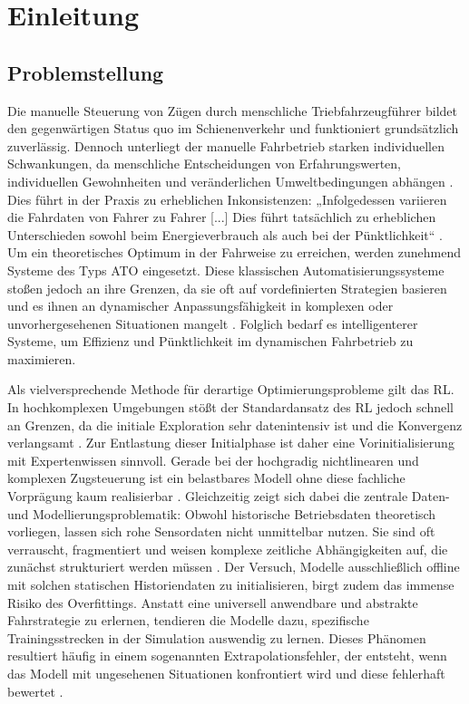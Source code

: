 \section{Einleitung}

\subsection{Problemstellung}
\label{sec:problemstellung}

Die manuelle Steuerung von Zügen durch menschliche Triebfahrzeugführer bildet den gegenwärtigen Status quo im Schienenverkehr und funktioniert grundsätzlich zuverlässig. 
Dennoch unterliegt der manuelle Fahrbetrieb starken individuellen Schwankungen, da menschliche Entscheidungen von Erfahrungswerten, individuellen Gewohnheiten und veränderlichen Umweltbedingungen abhängen \cite[vgl.~S.~2266]{chap1_Huang18}. 
Dies führt in der Praxis zu erheblichen Inkonsistenzen: „Infolgedessen variieren die Fahrdaten von Fahrer zu Fahrer [...] Dies führt tatsächlich zu erheblichen Unterschieden sowohl beim Energieverbrauch als auch bei der Pünktlichkeit“ \cite[S.~2267]{chap1_Huang18}. 
Um ein theoretisches Optimum in der Fahrweise zu erreichen, werden zunehmend Systeme des Typs \gls{ATO} eingesetzt.
Diese klassischen Automatisierungssysteme stoßen jedoch an ihre Grenzen, da sie oft auf vordefinierten Strategien basieren und es ihnen an dynamischer Anpassungsfähigkeit in komplexen oder unvorhergesehenen Situationen mangelt \cite[vgl.~S.~2]{chap1_Huang25}. 
Folglich bedarf es intelligenterer Systeme, um Effizienz und Pünktlichkeit im dynamischen Fahrbetrieb zu maximieren.

Als vielversprechende Methode für derartige Optimierungsprobleme gilt das \gls{RL}. 
In hochkomplexen Umgebungen stößt der Standardansatz des \gls{RL} jedoch schnell an Grenzen, da die initiale Exploration sehr datenintensiv ist und die Konvergenz verlangsamt \cite[vgl.~S.~1]{chap1_Wexler22}. 
Zur Entlastung dieser Initialphase ist daher eine Vorinitialisierung mit Expertenwissen sinnvoll. 
Gerade bei der hochgradig nichtlinearen und komplexen Zugsteuerung ist ein belastbares Modell ohne diese fachliche Vorprägung kaum realisierbar \cite[vgl.~S.~4]{chap1_Zhou20}. 
Gleichzeitig zeigt sich dabei die zentrale Daten- und Modellierungsproblematik: Obwohl historische Betriebsdaten theoretisch vorliegen, lassen sich rohe Sensordaten nicht unmittelbar nutzen. 
Sie sind oft verrauscht, fragmentiert und weisen komplexe zeitliche Abhängigkeiten auf, die zunächst strukturiert werden müssen \cite[vgl.~S.~5042]{chap1_Silva19}. 
Der Versuch, Modelle ausschließlich offline mit solchen statischen Historiendaten zu initialisieren, birgt zudem das immense Risiko des Overfittings. 
Anstatt eine universell anwendbare und abstrakte Fahrstrategie zu erlernen, tendieren die Modelle dazu, spezifische Trainingsstrecken in der Simulation auswendig zu lernen. 
Dieses Phänomen resultiert häufig in einem sogenannten Extrapolationsfehler, der entsteht, wenn das Modell mit ungesehenen Situationen konfrontiert wird und diese fehlerhaft bewertet \cite[vgl.~S.~3]{chap1_Wexler22}.
